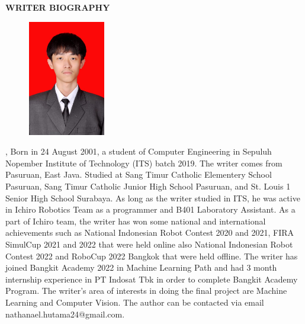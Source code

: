 \begin{center}
  \Large
  \textbf{WRITER BIOGRAPHY}
\end{center}


\vspace{2ex}

\begin{figure}
  \centering
  \vspace{-3ex}
  \includegraphics[width=0.3\textwidth]{gambar/nathan.jpg}
  \vspace{-4ex}
\end{figure}

\name{}, Born in 24 August 2001, a student of Computer Engineering in Sepuluh
Nopember Institute of Technology (ITS) batch 2019. The writer comes from Pasuruan, East Java.
Studied at Sang Timur Catholic Elementery School Pasuruan, Sang Timur Catholic Junior High School Pasuruan,
and St. Louis 1 Senior High School Surabaya. As long as the writer studied in ITS, he was active
in Ichiro Robotics Team as a programmer and B401 Laboratory Assistant. As a part of Ichiro team, the writer has won
some national and international achievements such as National Indonesian Robot Contest 2020 and 2021, FIRA SimulCup 2021 and 2022 that
were held online also National Indonesian Robot Contest 2022 and RoboCup 2022 Bangkok that were held offline.
The writer has joined Bangkit Academy 2022 in Machine Learning Path and had 3 month internship experience in PT Indosat Tbk
in order to complete Bangkit Academy Program. The writer's area of interests in doing the final project are Machine Learning and Computer Vision.
The author can be contacted via email nathanael.hutama24@gmail.com.